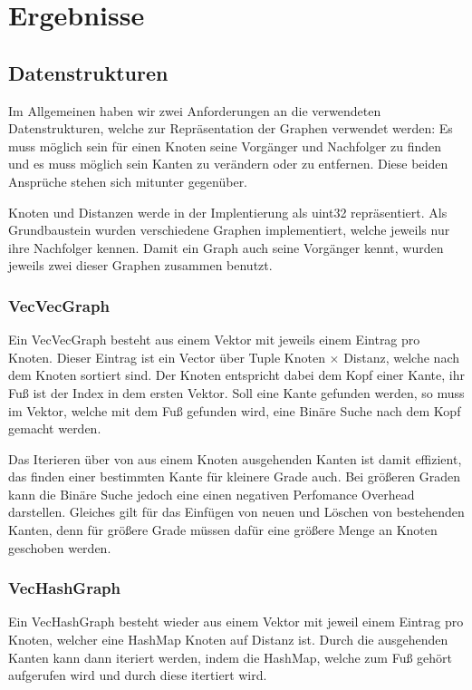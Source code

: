 \chapter{Ergebnisse}

\section{Datenstrukturen}

Im Allgemeinen haben wir zwei Anforderungen an die verwendeten Datenstrukturen, welche zur Repräsentation der Graphen verwendet werden: Es muss möglich sein für einen Knoten seine Vorgänger und Nachfolger zu finden und es muss möglich sein Kanten zu verändern oder zu entfernen.
Diese beiden Ansprüche stehen sich mitunter gegenüber.

Knoten und Distanzen werde in der Implentierung als uint32 repräsentiert.
Als Grundbaustein wurden verschiedene Graphen implementiert, welche jeweils nur ihre Nachfolger kennen.
Damit ein Graph auch seine Vorgänger kennt, wurden jeweils zwei dieser Graphen zusammen benutzt.

\subsection{VecVecGraph}

Ein VecVecGraph besteht aus einem Vektor mit jeweils einem Eintrag pro Knoten.
Dieser Eintrag ist ein Vector über Tuple Knoten $\times$ Distanz, welche nach dem Knoten sortiert sind.
Der Knoten entspricht dabei dem Kopf einer Kante, ihr Fuß ist der Index in dem ersten Vektor.
Soll eine Kante gefunden werden, so muss im Vektor, welche mit dem Fuß gefunden wird, eine Binäre Suche nach dem Kopf gemacht werden.

Das Iterieren über von aus einem Knoten ausgehenden Kanten ist damit effizient, das finden einer bestimmten Kante für kleinere Grade auch.
Bei größeren Graden kann die Binäre Suche jedoch eine einen negativen Perfomance Overhead darstellen.
Gleiches gilt für das Einfügen von neuen und Löschen von bestehenden Kanten, denn für größere Grade müssen dafür eine größere Menge an Knoten geschoben werden.

\subsection{VecHashGraph}

Ein VecHashGraph besteht wieder aus einem Vektor mit jeweil einem Eintrag pro Knoten, welcher eine HashMap Knoten auf Distanz ist.
Durch die ausgehenden Kanten kann dann iteriert werden, indem die HashMap, welche zum Fuß gehört aufgerufen wird und durch diese itertiert wird.

